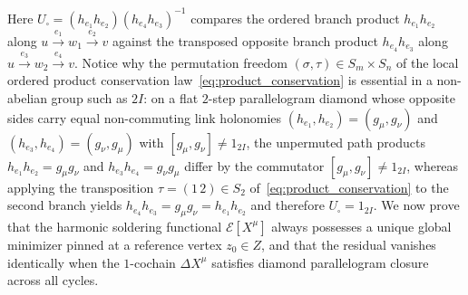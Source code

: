 \documentclass[11pt,a4paper]{article}
\theoremstyle{definition}
\theoremstyle{remark}
\begin{document}
Here $U_\square = (h_{e_1} h_{e_2})(h_{e_4} h_{e_3})^{-1}$ compares the ordered branch product $h_{e_1} h_{e_2}$ along $u \xrightarrow{e_1} w_1 \xrightarrow{e_2} v$ against the transposed opposite branch product $h_{e_4} h_{e_3}$ along $u \xrightarrow{e_3} w_2 \xrightarrow{e_4} v$. Notice why the permutation freedom $(\sigma, \tau) \in S_m \times S_n$ of the local ordered product conservation law~\eqref{eq:product_conservation} is essential in a non-abelian group such as $2I$: on a flat $2$-step parallelogram diamond whose opposite sides carry equal non-commuting link holonomies $(h_{e_1}, h_{e_2}) = (g_\mu, g_\nu)$ and $(h_{e_3}, h_{e_4}) = (g_\nu, g_\mu)$ with $[g_\mu, g_\nu] \neq 1_{2I}$, the unpermuted path products $h_{e_1}h_{e_2} = g_\mu g_\nu$ and $h_{e_3}h_{e_4} = g_\nu g_\mu$ differ by the commutator $[g_\mu, g_\nu] \neq 1_{2I}$, whereas applying the transposition $\tau = (1\,2) \in S_2$ of~\eqref{eq:product_conservation} to the second branch yields $h_{e_4}h_{e_3} = g_\mu g_\nu = h_{e_1}h_{e_2}$ and therefore $U_\square = 1_{2I}$. We now prove that the harmonic soldering functional $\mathcal{E}[X^\mu]$ always possesses a unique global minimizer pinned at a reference vertex $z_0 \in Z$, and that the residual vanishes identically when the $1$-cochain $\Delta X^\mu$ satisfies diamond parallelogram closure across all cycles.
\end{document}
